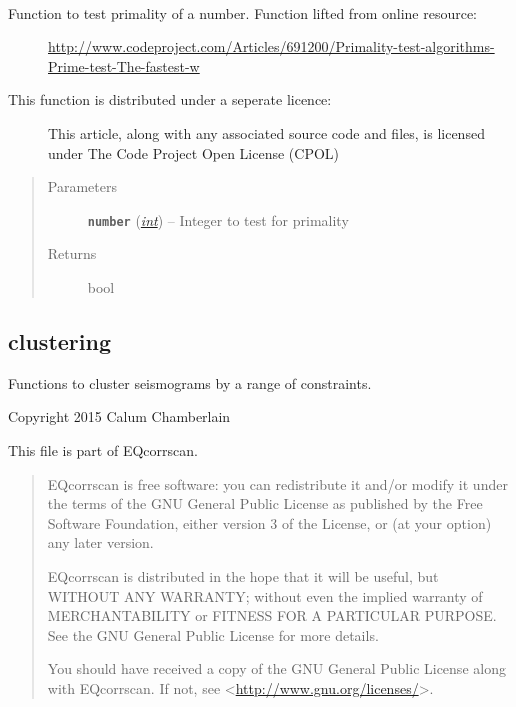 \documentclass[a4paper,10pt,english]{sphinxmanual}
\begin{document}
\begin{fulllineitems}
\label{submodules/utils.findpeaks:findpeaks.is_prime}~\begin{description}
\item[{Function to test primality of a number. Function lifted from online resource:}] \leavevmode
\href{http://www.codeproject.com/Articles/691200/Primality-test-algorithms-Prime-test-The-fastest-w}{http://www.codeproject.com/Articles/691200/Primality-test-algorithms-Prime-test-The-fastest-w}

\item[{This function is distributed under a seperate licence:}] \leavevmode
This article, along with any associated source code and files, is
licensed under The Code Project Open License (CPOL)

\end{description}
\begin{quote}\begin{description}
\item[{Parameters}] \leavevmode
\textbf{\texttt{number}} (\href{https://docs.python.org/library/functions.html\#int}{\emph{int}}) -- Integer to test for primality

\item[{Returns}] \leavevmode
bool

\end{description}\end{quote}

\end{fulllineitems}



\subsection{clustering}
\label{submodules/utils.clustering:clustering}\label{submodules/utils.clustering:module-clustering}\label{submodules/utils.clustering::doc}
Functions to cluster seismograms by a range of constraints.

Copyright 2015 Calum Chamberlain

This file is part of EQcorrscan.
\begin{quote}

EQcorrscan is free software: you can redistribute it and/or modify
it under the terms of the GNU General Public License as published by
the Free Software Foundation, either version 3 of the License, or
(at your option) any later version.

EQcorrscan is distributed in the hope that it will be useful,
but WITHOUT ANY WARRANTY; without even the implied warranty of
MERCHANTABILITY or FITNESS FOR A PARTICULAR PURPOSE.  See the
GNU General Public License for more details.

You should have received a copy of the GNU General Public License
along with EQcorrscan.  If not, see \textless{}\href{http://www.gnu.org/licenses/}{http://www.gnu.org/licenses/}\textgreater{}.
\end{quote}
\end{document}
